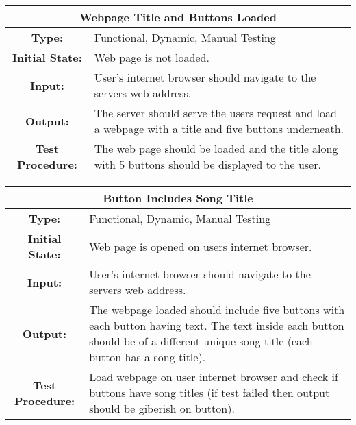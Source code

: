 \documentclass[12pt, titlepage]{article}
\begin{document}
\begin{center}
\begin{table}[H]
\begin{tabularx}{\textwidth}{| c X |}
\hline
\multicolumn{2}{|c|}{\textbf{Webpage Title and Buttons Loaded}}\\
\hline
\textbf{Type: } & Functional, Dynamic, Manual Testing\\

\textbf{Initial State: } & Web page is not loaded.\\

\textbf{Input: } & User's internet browser should navigate to the servers web address.\\

\textbf{Output: } & The server should serve the users request and load a webpage with a title and five buttons underneath.\\

\textbf{Test Procedure:  } &   The web page should be loaded and the title along with 5 buttons should be displayed to the user.\\
\hline
\end{tabularx}
\end{table}
\end{center}

\begin{center}
\begin{table}[H]
\begin{tabularx}{\textwidth}{| c X |}
\hline
\multicolumn{2}{|c|}{\textbf{Button Includes Song Title}}\\
\hline
\textbf{Type: } & Functional, Dynamic, Manual Testing\\

\textbf{Initial State: } & Web page is opened on users internet browser.\\

\textbf{Input: } & User's internet browser should navigate to the servers web address.\\

\textbf{Output: } & The webpage loaded should include five buttons with each button having text. The text inside each button should be of a different unique song title (each button has a song title).\\

\textbf{Test Procedure:  } & Load webpage on user internet browser and check if buttons have song titles (if test failed then output should be giberish on button).\\
\hline
\end{tabularx}
\end{table}
\end{center}
\end{document}

